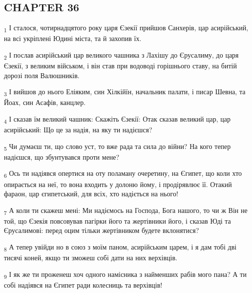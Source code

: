 \subsection{CHAPTER 36}
\begin{tcolorbox}
\textsubscript{1} І сталося, чотирнадцятого року царя Єзекії прийшов Санхерів, цар асирійський, на всі укріплені Юдині міста, та й захопив їх.
\end{tcolorbox}
\begin{tcolorbox}
\textsubscript{2} І послав асирійський цар великого чашника з Лахішу до Єрусалиму, до царя Єзекії, з великим військом, і він став при водоводі горішнього ставу, на битій дорозі поля Валюшників.
\end{tcolorbox}
\begin{tcolorbox}
\textsubscript{3} І вийшов до нього Еліяким, син Хілкійїн, начальник палати, і писар Шевна, та Йоах, син Асафів, канцлер.
\end{tcolorbox}
\begin{tcolorbox}
\textsubscript{4} І сказав їм великий чашник: Скажіть Єзекії: Отак сказав великий цар, цар асирійський: Що це за надія, на яку ти надієшся?
\end{tcolorbox}
\begin{tcolorbox}
\textsubscript{5} Чи думаєш ти, що слово уст, то вже рада та сила до війни? На кого тепер надієшся, що збунтувався проти мене?
\end{tcolorbox}
\begin{tcolorbox}
\textsubscript{6} Ось ти надіявся опертися на оту поламану очеретину, на Єгипет, що коли хто опирається на неї, то вона входить у долоню йому, і продірявлює її. Отакий фараон, цар єгипетський, для всіх, хто надіється на нього!
\end{tcolorbox}
\begin{tcolorbox}
\textsubscript{7} А коли ти скажеш мені: Ми надіємось на Господа, Бога нашого, то чи ж Він не той, що Єзекія повсовував пагірки його та жертівники його, і сказав Юді та Єрусалимові: перед оцим тільки жертівником будете вклонятися?
\end{tcolorbox}
\begin{tcolorbox}
\textsubscript{8} А тепер увійди но в союз з моїм паном, асирійським царем, і я дам тобі дві тисячі коней, якщо ти зможеш собі дати на них верхівців.
\end{tcolorbox}
\begin{tcolorbox}
\textsubscript{9} І як же ти проженеш хоч одного намісника з найменших рабів мого пана? А ти собі надіявся на Єгипет ради колесниць та верхівців!
\end{tcolorbox}
